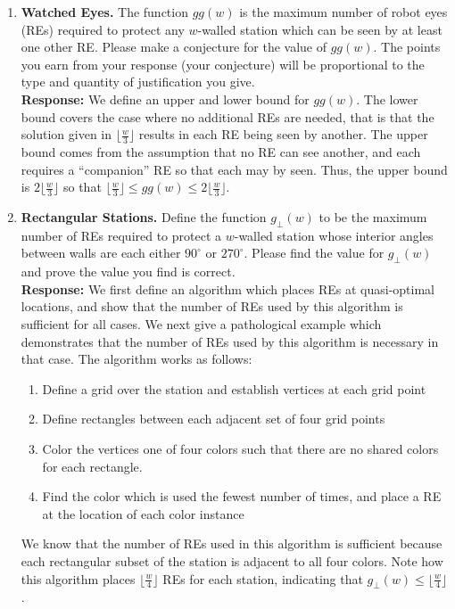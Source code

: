 \documentclass{article}
\newcommand{\response}[1]{\leavevmode\\[0.05in]{\bf Response: } #1 \leavevmode\\[0.05in]}
\begin{document}
\begin{enumerate}
	\item {\bf Watched Eyes.} The function $gg(w)$ is the maximum number of robot eyes (REs) required to protect any $w$-walled station which can be seen by at least one other RE.  Please make a conjecture for the value of $gg(w)$.  The points you earn from your response (your conjecture) will be proportional to the type and quantity of justification you give.  
		\response{We define an upper and lower bound for $gg(w)$.  The lower bound covers the case where no additional REs are needed, that is that the solution given in $\lfloor \frac{w}{3} \rfloor$ results in each RE being seen by another.  The upper bound comes from the assumption that no RE can see another, and each requires a ``companion'' RE so that each may by seen.  Thus, the upper bound is $2\lfloor\frac{w}{3}\rfloor$ so that $\lfloor\frac{w}{3}\rfloor \le gg(w) \le 2\lfloor\frac{w}{3}\rfloor$.}
	\item {\bf Rectangular Stations.}  Define the function $g_{\perp}(w)$ to be the maximum number of REs required to protect a $w$-walled station whose interior angles between walls are each either $90^{\circ}$ or $270^{\circ}$.  Please find the value for $g_{\perp}(w)$ and prove the value you find is correct.
		\response{We first define an algorithm which places REs at quasi-optimal locations, and show that the number of REs used by this algorithm is sufficient for all cases.  We next give a pathological example which demonstrates that the number of REs used by this algorithm is necessary in that case. The algorithm works as follows:
		\begin{enumerate}
			\item Define a grid over the station and establish vertices at each grid point
			\item Define rectangles between each adjacent set of four grid points
			\item Color the vertices one of four colors such that there are no shared colors for each rectangle.
			\item Find the color which is used the fewest number of times, and place a RE at the location of each color instance
		\end{enumerate}
		We know that the number of REs used in this algorithm is sufficient because each rectangular subset of the station is adjacent to all four colors. Note how this algorithm places $\lfloor \frac{w}{4} \rfloor$ REs for each station, indicating that $g_{\perp}(w) \le \lfloor \frac{w}{4}\rfloor$. \\[1.5in]
}
\end{enumerate}
\end{document}
